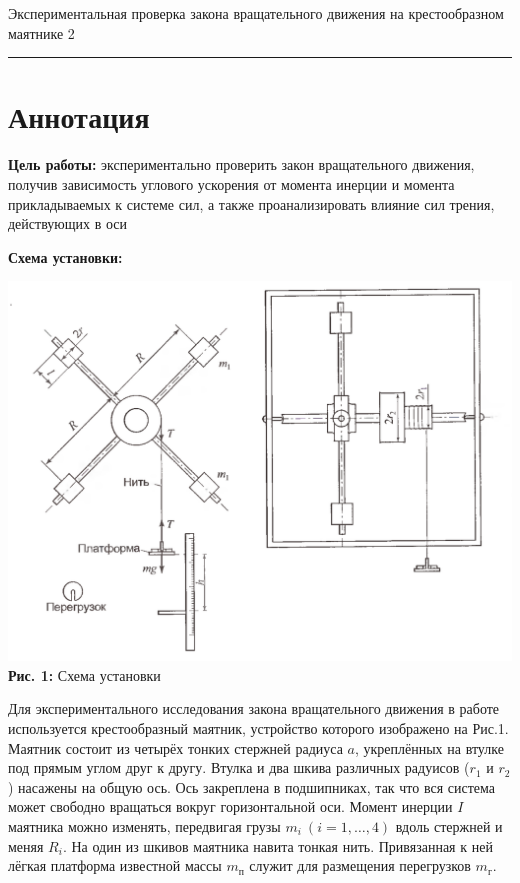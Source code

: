 \documentclass[12pt,a4paper]{scrartcl}
\begin{document}
	
	\begin{flushleft}
		\footnotesize{Экспериментальная проверка закона вращательного движения на крестообразном маятнике} \hspace{\fill} \footnotesize{2}
		\\[-0.3cm]\noindent\rule{\textwidth}{0.3pt}
	\end{flushleft}
	
	\section{Аннотация}
	
	\textbf{Цель работы: } экспериментально проверить закон вращательного движения, получив зависимость углового ускорения от момента инерции и момента прикладываемых к системе сил, а также проанализировать влияние сил трения, действующих в оси
	
	\textbf{Схема установки:}
	\begin{center}
		\includegraphics[scale=0.3]{PIC_1.png}
		\\\textbf{Рис. 1:} Схема установки
	\end{center}
		
	Для экспериментального исследования закона вращательного движения в работе используется крестообразный маятник, устройство которого изображено на Рис.1. Маятник состоит из четырёх тонких стержней радиуса $a$, укреплённых на втулке под прямым углом друг к другу. Втулка и два шкива различных радуисов  ($r_1$ и $r_2$) насажены на общую ось. Ось закреплена в подшипниках, так что вся система может свободно вращаться вокруг горизонтальной оси. Момент инерции $I$ маятника можно изменять, передвигая грузы $m_i\ (i = 1, \dots, 4)$ вдоль стержней и меняя $R_i$. На один из шкивов маятника навита тонкая нить. Привязанная к ней лёгкая платформа известной массы $m_{\text{п}}$ служит для размещения перегрузков $m_{\text{г}}$.
	
\end{document}
